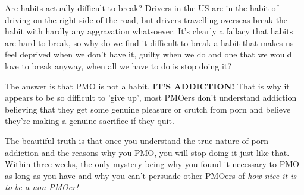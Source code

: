 \documentclass[easypeasy.tex]{subfiles}
\begin{document}
Are habits actually difficult to break? Drivers in the US are in the habit of driving on the right side of the road, but drivers travelling overseas break the habit with hardly any aggravation whatsoever. It's clearly a fallacy that habits are hard to break, so why do we find it difficult to break a habit that makes us feel deprived when we don't have it, guilty when we do and one that we would love to break anyway, when all we have to do is stop doing it?

The answer is that PMO is not a habit, \textbf{IT'S ADDICTION!} That is why it appears to be so difficult to 'give up', most PMOers don't understand addiction believing that they get some genuine pleasure or crutch from porn and believe they're making a genuine sacrifice if they quit.

The beautiful truth is that once you understand the true nature of porn addiction and the reasons why you PMO, you will stop doing it just like that. Within three weeks, the only mystery being why you found it necessary to PMO as long as you have and why you can't persuade other PMOers of \textit{how nice it is to be a non-PMOer!}
\end{document}

